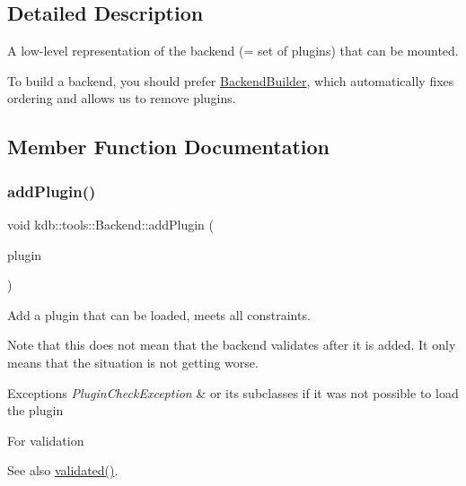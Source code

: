 \subsection{Detailed Description}
A low-\/level representation of the backend (= set of plugins) that can be mounted. 

To build a backend, you should prefer \mbox{\hyperlink{classkdb_1_1tools_1_1BackendBuilder}{Backend\+Builder}}, which automatically fixes ordering and allows us to remove plugins. 

\subsection{Member Function Documentation}
\mbox{\label{classkdb_1_1tools_1_1Backend_a2cce1cc51617baa5431a6036f5cfe05b}} 
\subsubsection{\texorpdfstring{addPlugin()}{addPlugin()}}
{\footnotesize\ttfamily void kdb\+::tools\+::\+Backend\+::add\+Plugin (\begin{DoxyParamCaption}\item[{\mbox{\hyperlink{classkdb_1_1tools_1_1PluginSpec}{Plugin\+Spec}} const \&}]{plugin }\end{DoxyParamCaption})\hspace{0.3cm}{\ttfamily [virtual]}}



Add a plugin that can be loaded, meets all constraints. 

\begin{DoxyNote}{Note}
that this does not mean that the backend validates after it is added. It only means that the situation is not getting worse.
\end{DoxyNote}

\begin{DoxyExceptions}{Exceptions}
{\em Plugin\+Check\+Exception} & or its subclasses if it was not possible to load the plugin\\
\hline
\end{DoxyExceptions}
For validation \begin{DoxySeeAlso}{See also}
\mbox{\hyperlink{classkdb_1_1tools_1_1Backend_a7b28929231bc592c1a83f42121405496}{validated()}}. 
\end{DoxySeeAlso}


